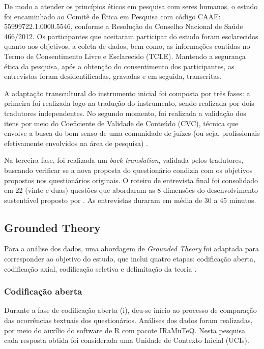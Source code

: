 De modo a atender os princípios éticos em pesquisa com seres humanos, o estudo foi encaminhado ao Comitê de Ética em Pesquisa com código CAAE: 55999722.1.0000.5546, conforme a Resolução do Conselho Nacional de Saúde 466/2012. Os participantes que aceitaram participar do estudo foram esclarecidos quanto aos objetivos, a coleta de dados, bem como, as informações contidas no Termo de Consentimento Livre e Esclarecido (TCLE). Mantendo a segurança ética da pesquisa, após a obtenção do consentimento dos participantes, as entrevistas foram desidentificadas, gravadas e em seguida, transcritas.

A adaptação transcultural do instrumento inicial foi composta por três fases: a primeira foi realizada logo na tradução do instrumento, sendo realizada por dois tradutores independentes. No segundo momento, foi realizada a validação dos itens por meio do Coeficiente de Validade de Conteúdo (CVC), técnica que envolve a busca do bom senso de uma comunidade de juízes (ou seja, profissionais efetivamente envolvidos na área de pesquisa) \cite{Gurgel2021}.

Na terceira fase, foi realizada um \textit{back-translation}, validada pelos tradutores, buscando verificar se a nova proposta do questionário condizia com os objetivos propostos nos questionários originais. O roteiro de entrevista final foi consolidado em 22 (vinte e duas) questões que abordaram as 8 dimensões do desenvolvimento sustentável proposto por \cite{Sachs2002CaminhosSustentavel}. As entrevistas duraram em média de 30 a 45 minutos. 

\subsection{Grounded Theory}

Para a análise dos dados, uma abordagem de \textit{Grounded Theory} foi adaptada para corresponder ao objetivo do estudo, que inclui quatro etapas: codificação aberta, codificação axial, codificação seletiva e delimitação da teoria \cite{Glaser2017DiscoveryResearch, Mills2006TheTheory}.

\subsubsection*{Codificação aberta}

Durante a fase de codificação aberta (i), deu-se início ao processo de comparação das ocorrências textuais dos questionários. Análises dos dados foram realizadas, por meio do auxílio do software de R com pacote IRaMuTeQ. Nesta pesquisa cada resposta obtida foi considerada uma Unidade de Contexto Inicial (UCIs).

